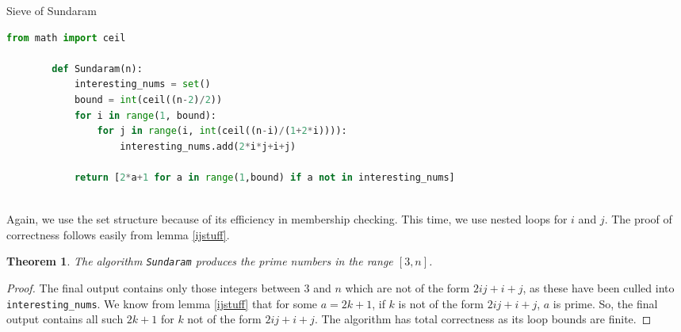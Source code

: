 \documentclass{amsart}
\newtheorem{thm}{Theorem}
\theoremstyle{definition}
\theoremstyle{case}
\begin{document}
	\begin{Algorithm}[H]\caption{Sieve of Sundaram}
        \begin{lstlisting}[language=Python]
        from math import ceil
        
        def Sundaram(n):
            interesting_nums = set()
            bound = int(ceil((n-2)/2))
            for i in range(1, bound):
                for j in range(i, int(ceil((n-i)/(1+2*i)))):
                    interesting_nums.add(2*i*j+i+j)
        
            return [2*a+1 for a in range(1,bound) if a not in interesting_nums]
        
        \end{lstlisting}
	\end{Algorithm}

	Again, we use the set structure because of its efficiency in membership checking. This time, we use nested loops for $i$ and $j$. The proof of correctness follows easily from lemma \ref{ijstuff}.
	
	\begin{thm}
		The algorithm \texttt{Sundaram} produces the prime numbers in the range $[3, n]$.
	\end{thm}
	\begin{proof}
		The final output contains only those integers between $3$ and $n$ which are not of the form $2ij+i+j$, as these have been culled into \texttt{interesting\_nums}. We know from lemma \ref{ijstuff} that for some $a=2k+1$, if $k$ is not of the form $2ij+i+j$, $a$ is prime. So, the final output contains all such $2k+1$ for $k$ not of the form $2ij+i+j$. The algorithm has total correctness as its loop bounds are finite.
	\end{proof}
	
\end{document}

